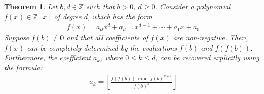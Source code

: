\documentclass[11pt,reqno]{article}
\theoremstyle{plain}
\newtheorem{theorem}{Theorem}
\theoremstyle{definition}
\newcommand{\floor}[1]{\left\lfloor #1 \right\rfloor}
\begin{document}
\begin{theorem} \label{theorem:encoding}
Let $b, d \in \mathbb{Z}$ such that $b > 0$, $d \geq 0$. Consider a polynomial $f(x) \in \mathbb{Z}[x]$ of degree $d$, which has the form
\begin{align*}
    f(x) = a_d x^d + a_{d-1} x^{d-1} + \cdots + a_1 x + a_0
\end{align*}
Suppose $f(b) \not= 0$ and that all coefficients of $f(x)$ are non-negative. Then, $f(x)$ can be completely determined by the evaluations $f(b)$ and $f(f(b))$. Furthermore, the coefficient $a_k$, where $0 \leq k \leq d$, can be recovered explicitly using the formula:
\begin{align*}
a_k = \floor{\frac{f(f(b)) \bmod{f(b)^{k + 1}}}{f(b)^{k}}}
\end{align*}
\end{theorem}
\end{document}
